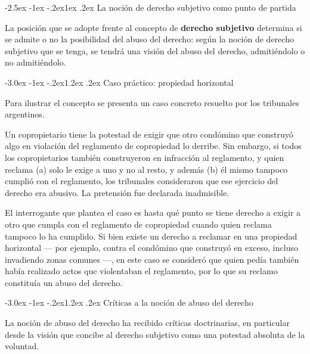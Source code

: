 \documentclass[12pt,oneside]{book}
\makeatletter
\renewcommand\section{\@startsection{section}{1}{\z@}%
  {-3.0ex \@plus -1ex \@minus -.2ex}{1.2ex \@plus .2ex}%
  {\normalfont\large\bfseries\color{acento}}}
\renewcommand\subsection{\@startsection{subsection}{2}{\z@}%
  {-2.5ex \@plus -1ex \@minus -.2ex}{1ex \@plus .2ex}%
  {\normalfont\normalsize\bfseries}}
\makeatother
\begin{document}
\subsection{La noción de derecho subjetivo como punto de partida}

La posición que se adopte frente al concepto de \textbf{derecho subjetivo} determina si se admite o no la posibilidad del abuso del derecho: según la noción de derecho subjetivo que se tenga, se tendrá una visión del abuso del derecho, admitiéndolo o no admitiéndolo.

\section{Caso práctico: propiedad horizontal}

Para ilustrar el concepto se presenta un caso concreto resuelto por los tribunales argentinos.

\begin{ejemplo}
Un copropietario tiene la potestad de exigir que otro condómino que construyó algo en violación del reglamento de copropiedad lo derribe. Sin embargo, si todos los copropietarios también construyeron en infracción al reglamento, y quien reclama (a) solo le exige a uno y no al resto, y además (b) él mismo tampoco cumplió con el reglamento, los tribunales consideraron que ese ejercicio del derecho era abusivo. La pretensión fue declarada inadmisible.
\end{ejemplo}

El interrogante que plantea el caso es hasta qué punto se tiene derecho a exigir a otro que cumpla con el reglamento de copropiedad cuando quien reclama tampoco lo ha cumplido. Si bien existe un derecho a reclamar en una propiedad horizontal --- por ejemplo, contra el condómino que construyó en exceso, incluso invadiendo zonas comunes ---, en este caso se consideró que quien pedía también había realizado actos que violentaban el reglamento, por lo que su reclamo constituía un abuso del derecho.

\section{Críticas a la noción de abuso del derecho}

La noción de abuso del derecho ha recibido críticas doctrinarias, en particular desde la visión que concibe al derecho subjetivo como una potestad absoluta de la voluntad.
\end{document}
